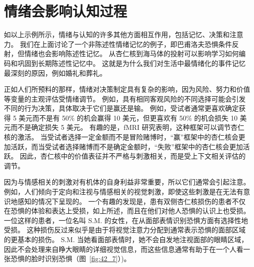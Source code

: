 \section{情绪会影响认知过程}

如以上示例所示，情绪与认知的许多其他方面相互作用，包括记忆、决策和注意力。
我们在上面讨论了一个非陈述性情绪记忆的例子，即巴甫洛夫恐惧条件反射，但情绪也会影响陈述性记忆。
从杏仁核到海马体的投射可以影响学习如何编码和巩固到长期陈述性记忆中。
这就是为什么我们对生活中最情绪化的事件记忆最深刻的原因，例如婚礼和葬礼。


正如人们所预料的那样，情绪对决策制定具有复杂的影响，因为风险、努力和价值等变量的主观评估受情绪调节。
例如，具有相同客观风险的不同选择可能会引发不同的行为决策，具体取决于它们是赢还是输。
例如，受试者通常更喜欢确定获得 5 美元而不是有 50\% 的机会赢得 10 美元，但更喜欢有 50\% 的机会损失 10 美元而不是确定损失 5 美元。
有趣的是，fMRI 研究表明，这种框架可以调节杏仁核的激活。
当受试者选择一定金额而不是冒险赌博时，“赢”框架中的杏仁核会更加活跃，而当受试者选择赌博而不是确定金额时，“失败”框架中的杏仁核会更加活跃。
因此，杏仁核中的价值表征并不严格与刺激相关，而是受上下文相关评估的调节。


因为与情感相关的刺激对有机体的自身利益非常重要，所以它们通常会引起注意。
例如，人们倾向于定向和注视与情感相关的视觉刺激，即使这些刺激是在无法有意识地感知的情况下呈现的。
一个有趣的发现是，患有双侧杏仁核损伤的患者不仅在恐惧的体验和表达上受损，如上所述，而且在他们对他人恐惧的认识上也受损。
一位这样的患者，一位名叫 S.M. 的女性，在从面部表情识别恐惧方面有选择性地受损。
这种损伤反过来似乎是由于将视觉注意力分配到通常表示恐惧的面部区域的更基本的损伤。
S.M. 当她看面部表情时，她不会自发地注视面部的眼睛区域，因此不会处理来自睁大眼睛的详细视觉信息，而这些信息通常有助于在一个人看一张恐惧的脸时识别恐惧（图~\ref{fig:42_7}）)。


